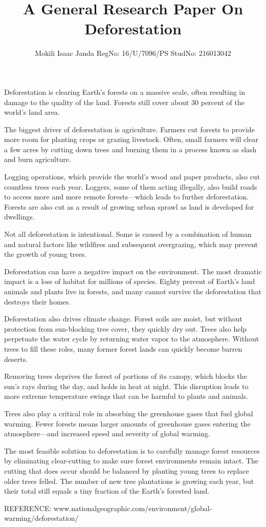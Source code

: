 \documentclass[12pt,a4paper]{article}
\author{Mokili Isaac Janda RegNo: 16/U/7096/PS StudNo: 216013042}
\title{A General Research Paper On Deforestation}
\begin{document}
\maketitle{}
Deforestation is clearing Earth's forests on a massive scale, often resulting in damage to the quality of the land. Forests still cover about 30 percent of the world’s land area.

The biggest driver of deforestation is agriculture. Farmers cut forests to provide more room for planting crops or grazing livestock. Often, small farmers will clear a few acres by cutting down trees and burning them in a process known as slash and burn agriculture.

Logging operations, which provide the world’s wood and paper products, also cut countless trees each year. Loggers, some of them acting illegally, also build roads to access more and more remote forests—which leads to further deforestation. Forests are also cut as a result of growing urban sprawl as land is developed for dwellings.

Not all deforestation is intentional. Some is caused by a combination of human and natural factors like wildfires and subsequent overgrazing, which may prevent the growth of young trees.

Deforestation can have a negative impact on the environment. The most dramatic impact is a loss of habitat for millions of species. Eighty percent of Earth’s land animals and plants live in forests, and many cannot survive the deforestation that destroys their homes.

Deforestation also drives climate change. Forest soils are moist, but without protection from sun-blocking tree cover, they quickly dry out. Trees also help perpetuate the water cycle by returning water vapor to the atmosphere. Without trees to fill these roles, many former forest lands can quickly become barren deserts.

Removing trees deprives the forest of portions of its canopy, which blocks the sun’s rays during the day, and holds in heat at night. This disruption leads to more extreme temperature swings that can be harmful to plants and animals.

Trees also play a critical role in absorbing the greenhouse gases that fuel global warming. Fewer forests means larger amounts of greenhouse gases entering the atmosphere—and increased speed and severity of global warming.

The most feasible solution to deforestation is to carefully manage forest resources by eliminating clear-cutting to make sure forest environments remain intact. The cutting that does occur should be balanced by planting young trees to replace older trees felled. The number of new tree plantations is growing each year, but their total still equals a tiny fraction of the Earth’s forested land.

REFERENCE: www.nationalgeographic.com/environment/global-warming/deforestation/
\end{document}
